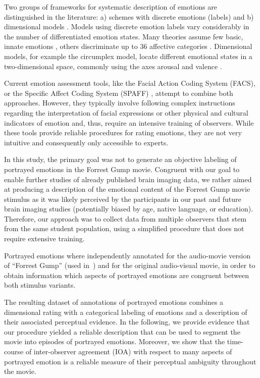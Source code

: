 \documentclass[10pt,a4paper,twocolumn]{article}
\begin{document}
Two groups of frameworks for systematic description of emotions are
distinguished in the literature: a) schemes with discrete emotions (labels) and
b) dimensional models \cite{GW2007}.  Models using discrete emotion labels vary
considerably in the number of differentiated emotion states. Many theories
assume few basic, innate emotions \cite{Ekm1992a}, others discriminate up to 36
affective categories \cite{Sch2005}.  Dimensional models, for example the
circumplex model, locate different emotional states in a two-dimensional space,
commonly using the axes arousal and valence \cite{Rus1980}.

Current emotion assessment tools, like the Facial Action Coding System (FACS),
or the Specific Affect Coding System (SPAFF) \cite{CG2007}, attempt to combine
both approaches. However, they typically involve following complex instructions
regarding the interpretation of facial expressions or other physical and
cultural indicators of emotion \cite[p. 281]{CG2007} and, thus, require an
intensive training of observers. While these tools provide reliable procedures
for rating emotions, they are not very intuitive and consequently only
accessible to experts. 

In this study, the primary goal was not to generate an objective labeling of
portrayed emotions in the Forrest Gump movie.  Congruent with our goal to
enable further studies of already published brain imaging data, we rather aimed
at producing a description of the emotional content of the Forrest Gump movie
stimulus as it was likely perceived by the participants in our past and future
brain imaging studies (potentially biased by age, native language, or
education). Therefore, our approach was to collect data from multiple observers
that stem from the same student population, using a simplified procedure that
does not require extensive training.

Portrayed emotions where independently annotated for the audio-movie version of
``Forrest Gump'' (used in~\cite{HBI+14}) and for the original audio-visual
movie, in order to obtain information which aspects of portrayed emotions are
congruent between both stimulus variants.

The resulting dataset of annotations of portrayed emotions combines a
dimensional rating with a categorical labeling of emotions and a description of
their associated perceptual evidence. In the following, we provide evidence
that our procedure yielded a reliable description that can be used to segment
the movie into episodes of portrayed emotions. Moreover, we show that the
time-course of inter-observer agreement (IOA) with respect to many aspects of
portrayed emotion is a reliable measure of their perceptual ambiguity
throughout the movie.
\end{document}

